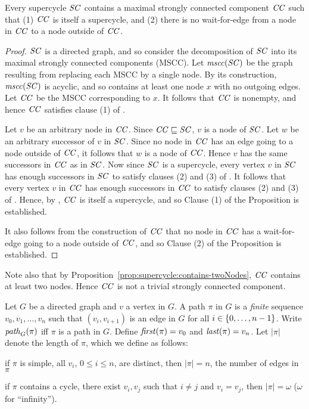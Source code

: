 \begin{proposition} \label{prop:supercycle:contains-mssc}
Every supercycle $\mathit{SC}$ contains a maximal strongly connected component $\mathit{CC}$
such that (1) $\mathit{CC}$ is itself a supercycle, and (2) there is no wait-for-edge from a node in $\mathit{CC}$ to a node outside of $\mathit{CC}$.
\end{proposition}
%
\begin{proof}
$\mathit{SC}$ is a directed graph, and so consider the decomposition of $\mathit{SC}$
into its maximal strongly connected components (MSCC). Let $\mathit{mscc(\mathit{SC})}$ be the graph resulting
from replacing each MSCC by a single node. By its construction,  $\mathit{mscc(\mathit{SC})}$ is acyclic, and so contains at least one
node $x$ with no outgoing edges. Let $\mathit{CC}$ be the MSCC corresponding to $x$. It follows that $\mathit{CC}$ is nonempty, and
hence $\mathit{CC}$ satisfies clause (1) of .

Let $v$ be an arbitrary node in $\mathit{CC}$. Since $\mathit{CC} \sqsubseteq \mathit{SC}$, $v$ is a node of $\mathit{SC}$. Let $w$ be an arbitrary successor of
$v$ in $\mathit{SC}$. Since no node in $\mathit{CC}$ has an edge going to a node outside of $\mathit{CC}$, it follows that $w$ is a node of $\mathit{CC}$.
Hence $v$ has the same successors in $\mathit{CC}$ as in $\mathit{SC}$. 
Now since $\mathit{SC}$ is a supercycle, every vertex $v$ in $\mathit{SC}$ has enough successors in $\mathit{SC}$ to satisfy clauses (2) and (3)
of . It follows that every vertex $v$ in $\mathit{CC}$ has enough successors in
$\mathit{CC}$ to satisfy clauses (2) and (3) of .  
%
Hence, by , $\mathit{CC}$ is itself a supercycle, and so Clause (1) of the Proposition is established.

It also follows from the construction of $\mathit{CC}$ that no node in $\mathit{CC}$ has a wait-for-edge going to a node outside of
$\mathit{CC}$, and so Clause (2) of the Proposition is established.
\end{proof}

Note also that by Proposition~\ref{prop:supercycle:contains-twoNodes}, $\mathit{CC}$ contains at least two nodes. Hence $\mathit{CC}$ is
not a trivial strongly connected component.






\begin{definition} \label{def:path} \label{defn:path}
Let $G$ be a directed graph and $v$ a vertex in $G$. A path $\pi$ in $G$ is a \emph{finite} sequence
$v_0, v_1, \ldots,v_n$ such that $(v_i, v_{i+1})$ is an edge in $G$ for all $i \in \{ 0,\ldots,n-1 \}$.
Write $\mathit{path}_{G}(\pi)$ iff $\pi$ is a path in $G$.
Define $\mathit{first}(\pi) = v_0$ and $\mathit{last}(\pi) = v_n$. 
%
Let $|\pi|$ denote the length of $\pi$, which we define as follows:
\be
\item if $\pi$ is simple, \ie all $v_i$, $0 \le i \le n$, are distinct, then $|\pi| = n$, \ie the
number of edges in $\pi$
\item if $\pi$ contains a cycle, \ie there exist $v_i, v_j$ such that $i \ne j$ and $v_i = v_j$, then
$|\pi| = \omega$ ($\omega$ for ``infinity'').
\ee
\end{definition}

